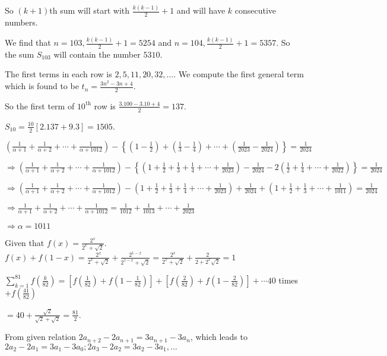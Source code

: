   So $(k + 1)$th sum will start with $\frac{k(k - 1)}{2} + 1$ and will have $k$ consecutive numbers.

  We find that $n = 103, \frac{k(k - 1)}{2} + 1 = 5254$ and $n = 104, \frac{k(k - 1)}{2} + 1 = 5357$. So the
  sum $S_{103}$ will contain the number $5310$.
\item The first terms in each row is $2, 5, 11, 20, 32, \ldots$. We compute the first general term which is
  found to be $t_n = \frac{3n^2 - 3n + 4}{2}$.

  So the first term of $10^{\mathrm{th}}$ row is $\frac{3.100 - 3.10 + 4}{2} = 137$.

  $S_{10} = \frac{10}{2}[2.137 + 9.3] = 1505$.
\item $\left(\frac{1}{\alpha + 1} + \frac{1}{\alpha + 2} + \cdots + \frac{1}{\alpha + 1012}\right)
  - \left\{\left(1 - \frac{1}{2}\right) + \left(\frac{1}{3} - \frac{1}{4}\right) + \cdots
  + \left(\frac{1}{2023} - \frac{1}{2024}\right)\right\} = \frac{1}{2024}$

  $\Rightarrow \left(\frac{1}{\alpha + 1} + \frac{1}{\alpha + 2} + \cdots + \frac{1}{\alpha + 1012}\right) -
  \left\{\left(1 + \frac{1}{2} + \frac{1}{3} + \frac{1}{4} + \cdots + \frac{1}{2023}\right) - \frac{1}{2024}
  - 2\left(\frac{1}{2} + \frac{1}{4} + \cdots + \frac{1}{2022}\right)\right\} = \frac{1}{2024}$

  $\Rightarrow \left(\frac{1}{\alpha + 1} + \frac{1}{\alpha + 2} + \cdots + \frac{1}{\alpha + 1012}\right) -
  \left(1 + \frac{1}{2} + \frac{1}{3} + \frac{1}{4} + \cdots + \frac{1}{2023}\right) + \frac{1}{2024}
  + \left(1 + \frac{1}{2} + \frac{1}{3} + \cdots + \frac{1}{1011}\right) = \frac{1}{2024}$

  $\Rightarrow \frac{1}{\alpha + 1} + \frac{1}{\alpha + 2} + \cdots + \frac{1}{\alpha + 1012}
  = \frac{1}{1012} + \frac{1}{1013} + \cdots + \frac{1}{2023}$

  $\Rightarrow \alpha = 1011$
\item Given that $f(x) = \frac{2^x}{2^x + \sqrt{2}}$. $f(x) + f(1 - x) = \frac{2^x}{2^x + \sqrt{2}}
  + \frac{2^{1 - x}}{2^{1 - x} + \sqrt{2}} = \frac{2^x}{2^x + \sqrt{2}} + \frac{2}{2 + 2^x\sqrt{2}} = 1$

  $\displaystyle\sum_{k = 1}^{81}f\left(\frac{k}{82}\right) = \left[f\left(\frac{1}{82}\right) + f\left(1
    - \frac{1}{82}\right)\right] + \left[f\left(\frac{2}{82}\right) + f\left(1 - \frac{2}{82}\right)\right]
  + \cdots 40$ times $+ f\left(\frac{41}{82}\right)$

  $= 40 + \frac{\sqrt{2}}{\sqrt{2} + \sqrt{2}} = \frac{81}{2}$.
\item From given relation $2a_{n + 2} - 2a_{n + 1} = 3a_{n + 1} - 3a_n$, which leads to $2a_2 - 2a_1 = 3a_1
  - 3a_0; 2a_3 - 2a_2 = 3a_2 - 3a_1, \ldots$

